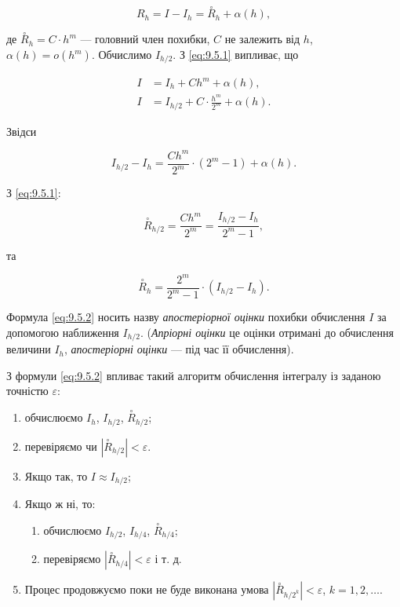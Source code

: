 \begin{equation}
	\label{eq:9.5.1}
	R_h = I - I_h = \overset{\circ} R_h + \alpha(h),
\end{equation}

де $\overset{\circ}{R}_h = C \cdot h^m$ --- головний член похибки, $C$ не залежить від $h$, $\alpha(h) = o(h^m)$. Обчислимо $I_{h/2}$. З \eqref{eq:9.5.1} випливає, що

\begin{align}
	I &= I_h + C h^m + \alpha(h), \\
	I &= I_{h/2} + C \cdot \frac{h^m}{2^m} + \alpha(h).
\end{align}

Звідси

\begin{equation}
	I_{h/2} - I_h = \frac{C h^m}{2^m} \cdot (2^m - 1) + \alpha(h).
\end{equation}

З \eqref{eq:9.5.1}:

\begin{equation}
	\label{eq:9.5.2}
	\overset{\circ} R_{h/2} = \frac{C h^m}{2^m} = \frac{I_{h/2} - I_h}{2^m - 1},
\end{equation}

та

\begin{equation}
	\overset{\circ} R_h = \frac{2^m}{2^m - 1} \cdot (I_{h/2} - I_h).
\end{equation}

Формула \eqref{eq:9.5.2} носить назву \textit{апостеріорної оцінки} похибки обчислення $I$ за допомогою наближення $I_{h/2}$. (\textit{Апріорні оцінки} це оцінки отримані до обчислення величини $I_h$, \textit{апостеріорні оцінки} --- під час її обчислення). \medskip

З формули \eqref{eq:9.5.2} впливає такий алгоритм обчислення інтегралу із заданою точністю $\varepsilon$:

\begin{enumerate}
	\item обчислюємо $I_h$, $I_{h/2}$, $\overset{\circ} R_{h/2}$; 

	\item перевіряємо чи $\left\vert \overset{\circ} R_{h/2} \right\vert < \varepsilon$.

	\item Якщо так, то $I \approx I_{h/2}$;

	\item Якщо ж ні, то:

	\begin{enumerate}
		\item обчислюємо $I_{h/2}$, $I_{h/4}$, $\overset{\circ} R_{h/4}$; 

		\item перевіряємо $\left\vert \overset{\circ} R_{h/4} \right\vert < \varepsilon$ і т. д.
	\end{enumerate}

	\item Процес продовжуємо поки не буде виконана умова $\left\vert \overset{\circ} R_{h/2^k} \right\vert < \varepsilon$, $k = 1,2, \ldots$.
\end{enumerate}


